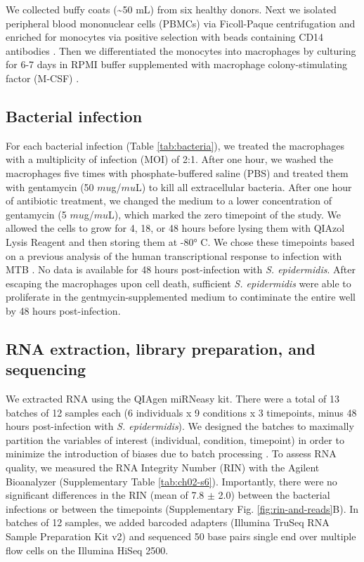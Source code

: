 We collected buffy coats (\textasciitilde{}50 mL) from six healthy
donors. Next we isolated peripheral blood mononuclear cells (PBMCs) via
Ficoll-Paque centrifugation \citep{Rivero-Lezcano2012} and enriched for
monocytes via positive selection with beads containing CD14 antibodies
\citep{Barreiro2012}. Then we differentiated the monocytes into
macrophages by culturing for 6-7 days in RPMI buffer supplemented with
macrophage colony-stimulating factor (M-CSF) \citep{Tailleux2003}.

\subsection{Bacterial infection}\label{bacterial-infection}

For each bacterial infection (Table \ref{tab:bacteria}), we treated the macrophages with
a multiplicity of infection (MOI) of 2:1. After one hour, we washed the
macrophages five times with phosphate-buffered saline (PBS) and treated
them with gentamycin (50 $mu$g/$mu$L) to kill all extracellular bacteria.
After one hour of antibiotic treatment, we changed the medium to a lower
concentration of gentamycin (5 $mu$g/$mu$L), which marked the zero timepoint
of the study. We allowed the cells to grow for 4, 18, or 48 hours before
lysing them with QIAzol Lysis Reagent and then storing them at -80° C.
We chose these timepoints based on a previous analysis of the human
transcriptional response to infection with MTB \citep{Tailleux2008}. No
data is available for 48 hours post-infection with \emph{S.
epidermidis}. After escaping the macrophages upon cell death, sufficient
\emph{S. epidermidis} were able to proliferate in the
gentmycin-supplemented medium to contiminate the entire well by 48 hours
post-infection.

\subsection{RNA extraction, library preparation, and
sequencing}\label{rna-extraction-library-preparation-and-sequencing}

We extracted RNA using the QIAgen miRNeasy kit. There were a total of 13
batches of 12 samples each (6 individuals x 9 conditions x 3 timepoints,
minus 48 hours post-infection with \emph{S. epidermidis}). We designed
the batches to maximally partition the variables of interest
(individual, condition, timepoint) in order to minimize the introduction
of biases due to batch processing \citep{Auer2010}. To assess RNA
quality, we measured the RNA Integrity Number (RIN) with the Agilent
Bioanalyzer (Supplementary Table \ref{tab:ch02-s6}). Importantly, there were no
significant differences in the RIN (mean of 7.8 $\pm$ 2.0) between the
bacterial infections or between the timepoints (Supplementary Fig. \ref{fig:rin-and-reads}B). In batches of 12 samples, we added barcoded adapters (Illumina
TruSeq RNA Sample Preparation Kit v2) and sequenced 50 base pairs single
end over multiple flow cells on the Illumina HiSeq 2500.

